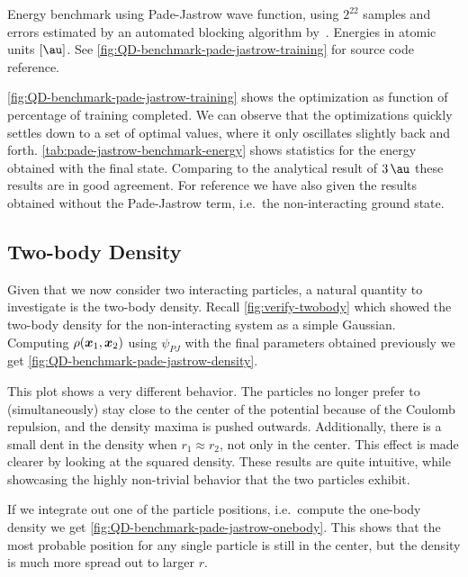 \documentclass[Thesis.tex]{subfiles}
\begin{document}
\begin{table}[h]
  \centering
  \caption[Energy estimates of Pade-Jastrow wave function]{Energy benchmark using Pade-Jastrow wave function, using $2^{22}$
    samples and errors estimated by an automated blocking algorithm
    by~\textcite{Jonsson-2018}. Energies in atomic units $[\si{\au}]$. See \cref{fig:QD-benchmark-pade-jastrow-training}
    for source code reference.}
  
  \label{tab:pade-jastrow-benchmark-energy}
\end{table}

\cref{fig:QD-benchmark-pade-jastrow-training} shows the optimization as function
of percentage of training completed. We can observe that the optimizations
quickly settles down to a set of optimal values, where it only oscillates
slightly back and forth. \cref{tab:pade-jastrow-benchmark-energy} shows
statistics for the energy obtained with the final state. Comparing to the
analytical result of $\SI{3}{\au}$ these results are in good agreement. For
reference we have also given the results obtained without the Pade-Jastrow term,
i.e.\ the non-interacting ground state.

\subsection{Two-body Density}

Given that we now consider two interacting particles, a natural quantity to
investigate is the two-body density. Recall \cref{fig:verify-twobody} which
showed the two-body density for the non-interacting system as a simple Gaussian.
Computing $\rho(\bm{x}_1, \bm{x}_2)$ using $\psi_{PJ}$ with the final parameters
obtained previously we get \cref{fig:QD-benchmark-pade-jastrow-density}.

This plot shows a very different behavior. The particles no longer prefer to
(simultaneously) stay close to the center of the potential because of the Coulomb repulsion, and
the density maxima is pushed outwards. Additionally, there is a small dent in
the density when $r_1\approx r_2$, not only in the center. This effect is made
clearer by looking at the squared density. These results are quite intuitive,
while showcasing the highly non-trivial behavior that the two particles exhibit.

If we integrate out one of the particle positions, i.e.\ compute the one-body
density we get \cref{fig:QD-benchmark-pade-jastrow-onebody}. This shows that the
most probable position for any single particle is still in the center, but the
density is much more spread out to larger $r$.
\end{document}
